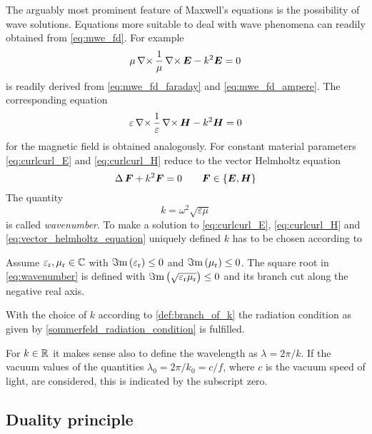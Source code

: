 The arguably most prominent feature of Maxwell's equations is the possibility
of wave solutions. Equations more suitable to deal with wave phenomena can
readily obtained from \eqref{eq:mwe_fd}.
For example
\begin{equation}\label{eq:curlcurl_E}
	\mu\curl\frac{1}{\mu}\curl\pvec{E} - k^2\pvec{E} = 0 
\end{equation}
is readily derived from \eqref{eq:mwe_fd_faraday} and \eqref{eq:mwe_fd_ampere}.
The corresponding equation
\begin{equation}\label{eq:curlcurl_H}
	\varepsilon\curl\frac{1}{\varepsilon}\curl\pvec{H} - k^2\pvec{H} = 0
\end{equation}
for the magnetic field is obtained analogously.
For constant material parameters \eqref{eq:curlcurl_E} and \eqref{eq:curlcurl_H}
reduce to the vector Helmholtz equation
\begin{equation}\label{eq:vector_helmholtz_equation}
	\laplace \pvec{F} + k^2 \pvec{F} = 0 \qquad
	\pvec{F} \in \left\{\pvec{E}, \pvec{H}\right\}
\end{equation}
The quantity
\begin{equation}\label{eq:wavenumber}
	k = \omega^2 \sqrt{\varepsilon \mu}
\end{equation}
is called \emph{wavenumber}.
To make a solution to \eqref{eq:curlcurl_E}, \eqref{eq:curlcurl_H} and
\eqref{eq:vector_helmholtz_equation} uniquely defined $k$ has to be chosen
according to
\begin{definition}\label{def:branch_of_k}
	Assume $\varepsilon_{\mathrm{r}}, \mu_{\mathrm{r}} \in \mathbb{C}$ with $\Im\mathrm{m}\left(\varepsilon_{\mathrm{r}}\right) \le 0$ and
	$\Im\mathrm{m}\left(\mu_{\mathrm{r}}\right) \le 0$. 
	The square root in \eqref{eq:wavenumber} is defined with
	$\Im\mathrm{m}\left(\sqrt{\varepsilon_{\mathrm{r}} \mu_{\mathrm{r}}}\right) \le 0$ and its branch cut along the negative real
	axis.
\end{definition}
\begin{remark}
	With the choice of $k$ according to \cref{def:branch_of_k} the radiation
	condition as given by \cref{sommerfeld_radiation_condition} is fulfilled.
\end{remark}
For $k \in \mathbb{R}$ it makes sense also to define the wavelength as
$\lambda = 2\pi / k$.
If the vacuum values of the quantities $\lambda_0 = 2\pi / k_0 = c / f$,
where $c$ is the vacuum speed of light, are considered, this is indicated by
the subscript zero.

\subsection{Duality principle}
\label{subsec:duality_principle}

